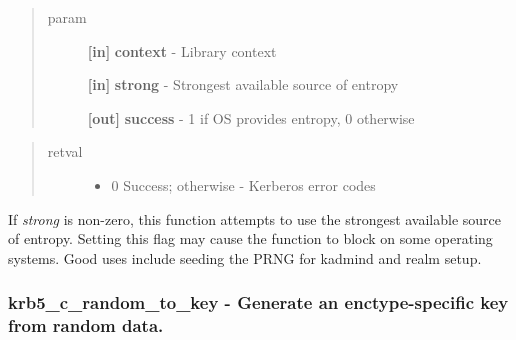 \documentclass[letterpaper,10pt,english]{sphinxmanual}
\begin{document}
\begin{quote}\begin{description}
\item[{param}] \leavevmode
\textbf{{[}in{]}} \textbf{context} - Library context

\textbf{{[}in{]}} \textbf{strong} - Strongest available source of entropy

\textbf{{[}out{]}} \textbf{success} - 1 if OS provides entropy, 0 otherwise

\end{description}\end{quote}
\begin{quote}\begin{description}
\item[{retval}] \leavevmode\begin{itemize}
\item {} 
0   Success; otherwise - Kerberos error codes

\end{itemize}

\end{description}\end{quote}

If \emph{strong} is non-zero, this function attempts to use the strongest available source of entropy. Setting this flag may cause the function to block on some operating systems. Good uses include seeding the PRNG for kadmind and realm setup.


\subsubsection{krb5\_c\_random\_to\_key -  Generate an enctype-specific key from random data.}
\label{appdev/refs/api/krb5_c_random_to_key:krb5-c-random-to-key-generate-an-enctype-specific-key-from-random-data}\label{appdev/refs/api/krb5_c_random_to_key::doc}

\begin{fulllineitems}
\label{appdev/refs/api/krb5_c_random_to_key:krb5_c_random_to_key}
\end{fulllineitems}
\end{document}
